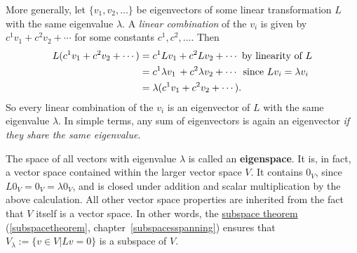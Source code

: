 More generally, let $\{ v_1, v_2, \ldots \}$ be eigenvectors of some linear transformation $L$ with the same eigenvalue $\lambda$.  A \emph{linear combination} of the $v_i$ is given by $c^1v_1+c^2v_2+\cdots$ for some constants $c^1, c^2,\ldots$.  Then
\begin{align*}
L(c^1v_1+c^2v_2+\cdots)
&= c^1Lv_1+c^2Lv_2+\cdots \text{ by linearity of $L$}\\
&= c^1\lambda v_1\,+c^2\lambda v_2+\cdots \hspace{.5mm} \text{ since $Lv_i=\lambda v_i$ }\\
&= \lambda (c^1v_1+c^2v_2+\cdots).
\end{align*}
So every linear combination of the $v_i$ is an eigenvector of $L$ with the same eigenvalue $\lambda$.
In simple terms, any sum of eigenvectors is again an eigenvector {\itshape if they share the same eigenvalue}.

The space of all vectors with eigenvalue $\lambda$ is called an {\bfseries eigenspace}.  It is, in fact, a vector space contained within the larger vector space $V$.  It contains $0_V$, since $L0_V=0_V=\lambda 0_V$, and is closed under addition and scalar multiplication by the above calculation.  All other vector space properties are inherited from the fact that $V$ itself is a vector space. In other words, the \hyperlink{sst}{subspace theorem} (\ref{subspacetheorem}, chapter~\ref{subspacesspanning}) ensures that $V_\lambda:=\{v\in V|Lv=0\}$ is a subspace of $V$.




